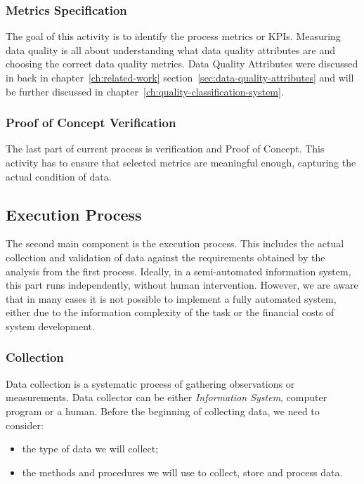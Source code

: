 \subsubsection{Metrics Specification}

The goal of this activity is to identify the process metrics or KPIs.
Measuring data quality is all about understanding what data quality attributes are and choosing the correct data quality metrics.
Data Quality Attributes were discussed in back in chapter~\ref{ch:related-work} section~\ref{sec:data-quality-attributes} and will be further discussed in chapter~\ref{ch:quality-classification-system}.

\subsubsection{Proof of Concept Verification}

The last part of current process is verification and Proof of Concept.
This activity has to ensure that selected metrics are meaningful enough, capturing the actual condition of data.

\subsection{Execution Process}

The second main component is the execution process.
This includes the actual collection and validation of data against the requirements obtained by the analysis from the first process.
Ideally, in a semi-automated information system, this part runs independently, without human intervention.
However, we are aware that in many cases it is not possible to implement a fully automated system, either due to the information complexity of the task or the financial costs of system development.

\subsubsection{Collection}

Data collection is a systematic process of gathering observations or measurements.
Data collector can be either \textit{Information System}, computer program or a human.
Before the beginning of collecting data, we need to consider:

\begin{itemize}
    \item the type of data we will collect;
    \item the methods and procedures we will use to collect, store and process data.
\end{itemize}

